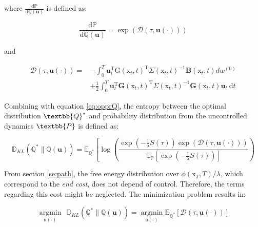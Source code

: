 \documentclass[]{hdsr}
\begin{document}

where $\frac{\mathrm{d} \mathbb{P}}{\mathrm{d} \mathbb{Q}(\mathbf{u})}$ is defined as:

\begin{equation}
\frac{\mathrm{d} \mathbb{P}}{\mathrm{d} \mathbb{Q}(\mathbf{u})}=\exp (\mathcal{D}(\tau, \mathbf{u}(\cdot)))
\end{equation}

and 

\begin{equation}
\begin{aligned}
\mathcal{D}(\tau, \mathbf{u}(\cdot))=&-\int_{0}^{T} \mathbf{u}_{t}^{\mathrm{T}} \mathrm{G}\left(\mathrm{x}_{t}, t\right)^{\mathrm{T}} \Sigma\left(\mathrm{x}_{t}, t\right)^{-1} \mathbf{B}\left(\mathrm{x}_{t}, t\right) d w^{(0)} \\
&+\frac{1}{2} \int_{0}^{T} \mathbf{u}_{t}^{\mathrm{T}} \mathbf{G}\left(\mathrm{x}_{t}, t\right)^{\mathrm{T}} \Sigma\left(\mathrm{x}_{t}, t\right)^{-1} \mathbf{G}\left(\mathrm{x}_{t}, t\right) \mathbf{u}_{t} \mathrm{~d} t
\end{aligned}
\end{equation}

Combining with equation \ref{eq:opprQ}, the entropy between the optimal distribution $\textbb{Q}^*$ and probability distribution from the uncontrolled dynamics $\textbb{P}$ is defined as:

\begin{equation}
\mathbb{D}_{K L}\left(\mathbb{Q}^{*} \| \mathbb{Q}(\mathbf{u})\right)=\mathbb{E}_{\mathbb{Q}^{*}}\left[\log \left(\frac{\exp \left(-\frac{1}{\lambda} S(\tau)\right) \exp (\mathcal{D}(\tau, \mathbf{u}(\cdot)))}{\mathbb{E}_{\mathbb{P}}\left[\exp \left(-\frac{1}{\lambda} S(\tau)\right)\right]}\right)\right.
\end{equation}

From section \ref{se:path}, the free energy distribution over $\phi\left(\mathrm{x}_{T}, T\right)/\lambda$, which correspond to the \textit{end cost}, does not depend of control. Therefore, the terms regarding this cost might be neglected. The minimization problem results in:

\begin{equation}
\underset{\mathfrak{u}(\cdot)}{\operatorname{argmin}} \:\: \mathbb{D}_{K L}\left(\mathbb{Q}^{*} \| \mathbb{Q}(\mathbf{u})\right)=\underset{\mathfrak{u}(\cdot)}{\operatorname{argmin}} \mathrm{E}_{\mathbb{Q}^{*}}[\mathcal{D}(\tau, \mathbf{u}(\cdot))]
\end{equation}
\end{document}
